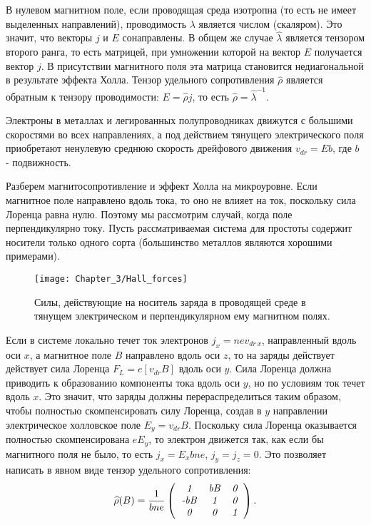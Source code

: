 В нулевом магнитном поле, если проводящая среда изотропна (то есть не имеет выделенных направлений), проводимость $\lambda$ является числом (скаляром). Это значит, что векторы $j$ и $E$ сонаправлены. В общем же случае $\widehat{\lambda}$ является тензором второго ранга, то есть матрицей, при умножении которой на вектор $E$ получается вектор $j$. В присутствии магнитного поля эта матрица становится недиагональной в результате эффекта Холла. Тензор удельного сопротивления $\widehat{\rho}$ является обратным к тензору проводимости: $E=\widehat{\rho}j$, то есть $\widehat{\rho}=\widehat{\lambda}^{-1}$.

Электроны в металлах и легированных полупроводниках движутся с большими скоростями во всех направлениях, а под действием тянущего
электрического поля приобретают ненулевую среднюю скорость дрейфового движения $v_{dr}=  Eb$, где $b$ - подвижность.

Разберем магнитосопротивление и эффект Холла на микроуровне. Если магнитное поле направлено вдоль тока, то
оно не влияет на ток, поскольку сила Лоренца равна нулю. Поэтому мы рассмотрим случай, когда поле перпендикулярно
току. Пусть рассматриваемая система для простоты содержит носители только одного сорта (большинство металлов
являются хорошими примерами).
\begin{figure}[h!]
	\texttt{[image: Chapter\_3/Hall\_forces]}
	\caption{Силы, действующие на носитель заряда в проводящей среде в тянущем электрическом и перпендикулярном ему магнитном полях.}
\end{figure}

Если в системе локально течет ток электронов $j_x=nev_{dr\, x}$, направленный вдоль оси $x$, а магнитное поле $B$ направлено вдоль оси $z$, то на заряды действует действует сила Лоренца $ F_{L}=e[v_{dr}B]$ вдоль оси $y$.
Сила Лоренца должна приводить к образованию компоненты тока вдоль оси $y$, но по условиям ток течет вдоль $x$. Это значит, что заряды должны перераспределиться таким образом, чтобы полностью скомпенсировать силу
Лоренца, создав в $y$ направлении электрическое холловское поле $E_y=v_{dr}B$. Поскольку сила Лоренца
оказывается полностью скомпенсирована $eE_y$, то электрон движется так, как если бы магнитного поля не
было, то есть $j_x=E_xbne$, $j_y=j_z=0$. Это позволяет написать в явном виде тензор удельного сопротивления:
\begin{equation}
	\widehat{\rho}(B)=\frac{1}{bne}\left(
	\begin{tabular}{ccc}
		{\it 1} & {\it bB} & {\it 0} \\
		{\it -bB} &{\it 1}& {\it 0} \\
		{\it 0} &{\it 0}& {\it 1}\\
	\end{tabular}
	\right).
	\eqmark{3.17}
\end{equation}

